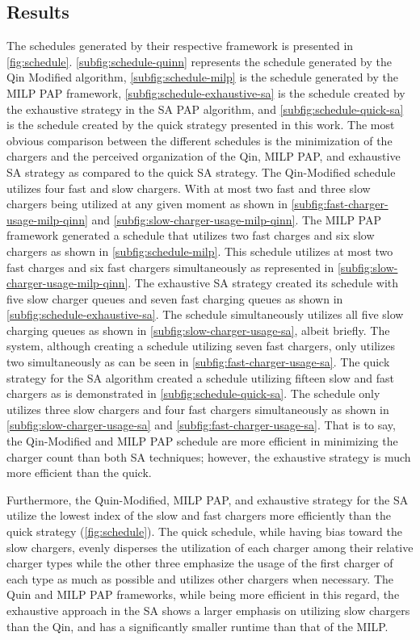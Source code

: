 \documentclass[11pt,a4paper,final]{article}
\begin{document}
\subsection{Results}
\label{sec:results}
The schedules generated by their respective framework is presented in \ref{fig:schedule}. \ref{subfig:schedule-quinn}
represents the schedule generated by the Qin Modified algorithm, \ref{subfig:schedule-milp} is the schedule generated by
the MILP PAP framework, \ref{subfig:schedule-exhaustive-sa} is the schedule created by the exhaustive strategy in the
SA PAP algorithm, and \ref{subfig:schedule-quick-sa} is the schedule created by the quick strategy presented in this
work. The most obvious comparison between the different schedules is the minimization of the chargers and the perceived
organization of the Qin, MILP PAP, and exhaustive SA strategy as compared to the quick SA strategy. The Qin-Modified
schedule utilizes four fast and slow chargers. With at most two fast and three slow chargers being utilized at any given
moment as shown in \ref{subfig:fast-charger-usage-milp-qinn} and \ref{subfig:slow-charger-usage-milp-qinn}. The MILP PAP
framework generated a schedule that utilizes two fast charges and six slow chargers as shown in
\ref{subfig:schedule-milp}. This schedule utilizes at most two fast charges and six fast chargers simultaneously as
represented in \ref{subfig:slow-charger-usage-milp-qinn}. The exhaustive SA strategy created its schedule with five slow
charger queues and seven fast charging queues as shown in \ref{subfig:schedule-exhaustive-sa}. The schedule
simultaneously utilizes all five slow charging queues as shown in \ref{subfig:slow-charger-usage-sa}, albeit briefly.
The system, although creating a schedule utilizing seven fast chargers, only utilizes two simultaneously as can be seen
in \ref{subfig:fast-charger-usage-sa}. The quick strategy for the SA algorithm created a schedule utilizing fifteen slow
and fast chargers as is demonstrated in \ref{subfig:schedule-quick-sa}. The schedule only utilizes three slow chargers
and four fast chargers simultaneously as shown in \ref{subfig:slow-charger-usage-sa} and
\ref{subfig:fast-charger-usage-sa}. That is to say, the Qin-Modified and MILP PAP schedule are more efficient in
minimizing the charger count than both SA techniques; however, the exhaustive strategy is much more efficient than the
quick.

Furthermore, the Quin-Modified, MILP PAP, and exhaustive strategy for the SA utilize the lowest index of the slow and
fast chargers more efficiently than the quick strategy (\ref{fig:schedule}). The quick schedule, while having bias
toward the slow chargers, evenly disperses the utilization of each charger among their relative charger types while the
other three emphasize the usage of the first charger of each type as much as possible and utilizes other chargers when
necessary. The Quin and MILP PAP frameworks, while being more efficient in this regard, the exhaustive approach in the
SA shows a larger emphasis on utilizing slow chargers than the Qin, and has a significantly smaller runtime than that of
the MILP.
\end{document}

